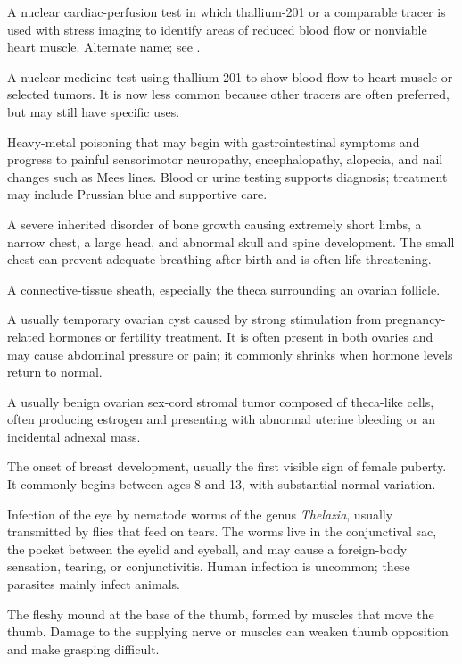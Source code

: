  A nuclear cardiac-perfusion test in which thallium-201 or a comparable tracer is used with stress imaging to identify areas of reduced blood flow or nonviable heart muscle.
 Alternate name; see .

 A nuclear-medicine test using thallium-201 to show blood flow to heart muscle or selected tumors. It is now less common because other tracers are often preferred, but may still have specific uses.

 Heavy-metal poisoning that may begin with gastrointestinal symptoms and progress to painful sensorimotor neuropathy, encephalopathy, alopecia, and nail changes such as Mees lines. Blood or urine testing supports diagnosis; treatment may include Prussian blue and supportive care.

 A severe inherited disorder of bone growth causing extremely short limbs, a narrow chest, a large head, and abnormal skull and spine development. The small chest can prevent adequate breathing after birth and is often life-threatening.

 A connective-tissue sheath, especially the theca surrounding an ovarian follicle.

 A usually temporary ovarian cyst caused by strong stimulation from pregnancy-related hormones or fertility treatment. It is often present in both ovaries and may cause abdominal pressure or pain; it commonly shrinks when hormone levels return to normal.

 A usually benign ovarian sex-cord stromal tumor composed of theca-like cells, often producing estrogen and presenting with abnormal uterine bleeding or an incidental adnexal mass.

 The onset of breast development, usually the first visible sign of female puberty. It commonly begins between ages 8 and 13, with substantial normal variation.

 Infection of the eye by nematode worms of the genus \textit{Thelazia}, usually transmitted by flies that feed on tears. The worms live in the conjunctival sac, the pocket between the eyelid and eyeball, and may cause a foreign-body sensation, tearing, or conjunctivitis. Human infection is uncommon; these parasites mainly infect animals.

 The fleshy mound at the base of the thumb, formed by muscles that move the thumb. Damage to the supplying nerve or muscles can weaken thumb opposition and make grasping difficult.


